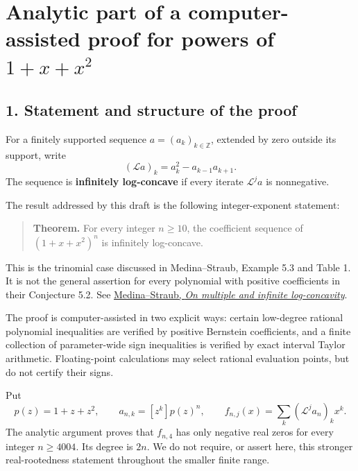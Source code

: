 \documentclass[
  11pt,
]{article}
\begin{document}
\clearpage

\section{\texorpdfstring{Analytic part of a computer-assisted proof for
powers of
\(1+x+x^2\)}{Analytic part of a computer-assisted proof for powers of 1+x+x\^{}2}}\label{analytic-part-of-a-computer-assisted-proof-for-powers-of-1xx2}

\subsection{1. Statement and structure of the
proof}\label{statement-and-structure-of-the-proof}

For a finitely supported sequence \(a=(a_k)_{k\in\mathbb Z}\), extended
by zero outside its support, write \[
 (\mathcal La)_k=a_k^2-a_{k-1}a_{k+1}.
\] The sequence is \textbf{infinitely log-concave} if every iterate
\(\mathcal L^j a\) is nonnegative.

The result addressed by this draft is the following integer-exponent
statement:

\begin{quote}
\textbf{Theorem.} For every integer \(n\ge10\), the coefficient sequence
of \((1+x+x^2)^n\) is infinitely log-concave.
\end{quote}

This is the trinomial case discussed in Medina--Straub, Example 5.3 and
Table 1. It is not the general assertion for every polynomial with
positive coefficients in their Conjecture 5.2. See
\href{https://arminstraub.com/downloads/pub/infinitelogconcavity.pdf}{Medina--Straub,
\emph{On multiple and infinite log-concavity}}.

The proof is computer-assisted in two explicit ways: certain low-degree
rational polynomial inequalities are verified by positive Bernstein
coefficients, and a finite collection of parameter-wide sign
inequalities is verified by exact interval Taylor arithmetic.
Floating-point calculations may select rational evaluation points, but
do not certify their signs.

Put \[
 p(z)=1+z+z^2,\qquad a_{n,k}=[z^k]p(z)^n,
 \qquad f_{n,j}(x)=\sum_k(\mathcal L^j a_n)_k x^k.
\] The analytic argument proves that \(f_{n,4}\) has only negative real
zeros for every integer \(n\ge4004\). Its degree is \(2n\). We do not
require, or assert here, this stronger real-rootedness statement
throughout the smaller finite range.
\end{document}
